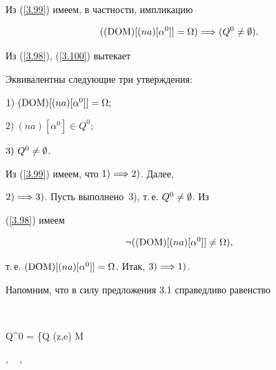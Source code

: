 Из (\ref{3.99}) имеем, в частности, импликацию


\begin{equation}\label{3.100}


((\DOM)[(na)[{\alpha}^0]] = \Om) \Lo ({Q^0} \ne \emp).


\end{equation}


Из (\ref{3.98}), (\ref{3.100}) вытекает 








\begin{thms}


Эквивалентны следующие три утверждения\/${:}$





$1) \ (\operatorname{DOM})[(na)[{\alpha}^0]] = \Omega;$





$2) \ (na)[{\alpha}^0] \in {Q^0};$





$3) \ {Q^0} \ne \emptyset$.


\end{thms}








\begin{pf}


Из (\ref{3.99}) имеем, что $1) \Longrightarrow 2)$. Далее,


$2) \Longrightarrow 3)$. Пусть выполнено~3), т.\,е. ${Q^0} \ne \emptyset$. Из


(\ref{3.98}) имеем


$$


\neg ((\DOM)[(na)[{\alpha}^0]] \ne\Om),


$$


т.\,е. $(\operatorname{DOM})[(na)[{\alpha}^0]] = \Omega$. Итак, $3) \Longrightarrow 1)$.


\end{pf}





Напомним, что в силу предложения 3.1 справедливо равенство


$$


{Q^0} = \{\alpha \in Q \mid (z,e) \in M \  \in


, \ \fo{\omega} , \  \in


